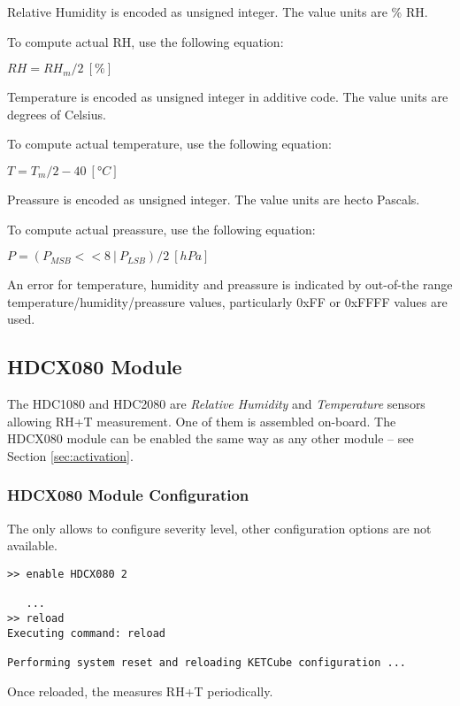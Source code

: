   Relative Humidity is encoded as unsigned integer. The value units are \% RH.
  
  To compute actual RH, use the following equation:
  
  $RH = RH_m / 2 ~[\%]$

  Temperature is encoded as unsigned integer in additive code. The value units are degrees of Celsius.
  
  To compute actual temperature, use the following equation:
  
  $T = T_m / 2 - 40 ~[°C]$
  
  Preassure is encoded as unsigned integer. The value units are hecto Pascals.
  
  To compute actual preassure, use the following equation:
  
  $P = (P_{MSB} << 8 ~|~ P_{LSB}) / 2 ~[hPa]$
  
  
  An error for temperature, humidity and preassure is indicated by out-of-the range temperature/humidity/preassure values, particularly 0xFF or 0xFFFF values are used.
  

\clearpage
\subsection{HDCX080 Module}

The HDC1080 and HDC2080 are {\it Relative Humidity} and {\it Temperature} sensors allowing RH+T measurement. One of them is assembled on-board. The HDCX080 module can be enabled the same way as any other module -- see Section \ref{sec:activation}.

\subsubsection{HDCX080 Module Configuration}
  The  only allows to configure severity level, other configuration options are not available.
  
\begin{docCodeExample}
\begin{verbatim}
>> enable HDCX080 2

   ...
>> reload
Executing command: reload

Performing system reset and reloading KETCube configuration ...  
\end{verbatim}
\end{docCodeExample}
  
  Once reloaded, the  measures RH+T periodically. 
  
